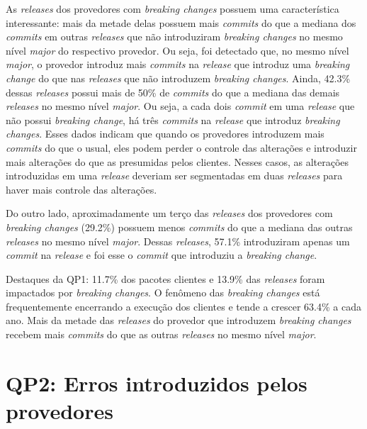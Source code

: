 As \textit{releases} dos provedores com \textit{breaking changes} possuem uma característica interessante: mais da metade delas possuem mais \textit{commits} do que a mediana dos \textit{commits} em outras \textit{releases} que não introduziram \textit{breaking changes} no mesmo nível \textit{major} do respectivo provedor. Ou seja, foi detectado que, no mesmo nível \textit{major}, o provedor introduz mais \textit{commits} na \textit{release} que introduz uma \textit{breaking change} do que nas \textit{releases} que não introduzem \textit{breaking changes}. Ainda, 42.3\% dessas \textit{releases} possui mais de 50\% de \textit{commits} do que a mediana das demais \textit{releases} no mesmo nível \textit{major}. Ou seja, a cada dois \textit{commit} em uma \textit{release} que não possui \textit{breaking change}, há três \textit{commits} na \textit{release} que introduz \textit{breaking changes}. Esses dados indicam que quando os provedores introduzem mais \textit{commits} do que o usual, eles podem perder o controle das alterações e introduzir mais alterações do que as presumidas pelos clientes. Nesses casos, as alterações introduzidas em uma \textit{release} deveriam ser segmentadas em duas \textit{releases} para haver mais controle das alterações.

Do outro lado, aproximadamente um terço das \textit{releases} dos provedores com \textit{breaking changes} (29.2\%) possuem menos \textit{commits} do que a mediana das outras \textit{releases} no mesmo nível \textit{major}. Dessas \textit{releases}, 57.1\% introduziram apenas um \textit{commit} na \textit{release} e foi esse o \textit{commit} que introduziu a \textit{breaking change}.

\begin{mdframed}
Destaques da QP1: 11.7\% dos pacotes clientes e 13.9\% das \textit{releases} foram impactados por \textit{breaking changes}. O fenômeno das \textit{breaking changes} está frequentemente encerrando a execução dos clientes e tende a crescer 63.4\% a cada ano. Mais da metade das \textit{releases} do provedor que introduzem \textit{breaking changes} recebem mais \textit{commits} do que as outras \textit{releases} no mesmo nível \textit{major}.
\end{mdframed}


\section{QP2: Erros introduzidos pelos provedores}
\label{sec:qp2:results}

